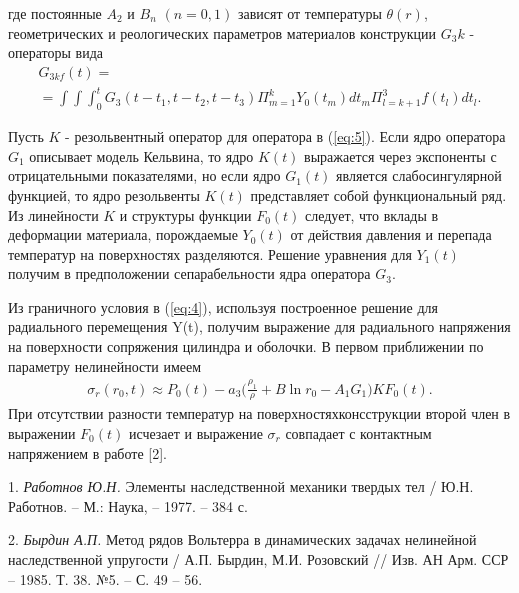 \noindent где постоянные $A_2$ и $B_n$ $(n=0,1)$ зависят от температуры $\theta(r)$,
геометрических и реологических параметров материалов конструкции $G_3k$ - операторы вида
\begin{equation*}
    \begin{gathered}
        G_{3kf}(t)= \\
        =\int\!\!\int\!\!\int^{t}_{0}G_3(t-t_1,t-t_2,t-t_3)\Pi^k_{m=1}Y_0(t_m)dt_m\Pi^3_{l=k+1}f(t_l)dt_l.
    \end{gathered}
\end{equation*}


Пусть $K$ - резольвентный оператор для оператора в (\ref{eq:5}). Если ядро оператора $G_1$ описывает модель Кельвина, то ядро $K(t)$ выражается через экспоненты с отрицательными показателями,
но если ядро $G_1(t)$ является слабосингулярной функцией, то ядро резольвенты $K(t)$ представляет собой функциональный ряд.
Из линейности $K$ и структуры функции $F_0(t)$ следует, что вклады в деформации материала, порождаемые $Y_0(t)$ от действия давления и перепада температур на поверхностях разделяются.
Решение уравнения для $Y_1(t)$ получим в предположении сепарабельности ядра оператора $G_3$.

Из граничного условия в (\ref{eq:4}), используя построенное решение для радиального перемещения Y(t), получим выражение для радиального напряжения на поверхности сопряжения цилиндра и оболочки. В первом приближении по параметру нелинейности имеем
\begin{equation}\label{eq:6}
    \begin{gathered}
        \sigma_r(r_0,t)\approx P_0(t)-a_3\bigg(\frac{\rho_1}{\rho}+B\ln r_0-A_1G_1\bigg)KF_0(t).
    \end{gathered}
\end{equation}
При отсутствии разности температур на поверхностях\linebreak консструкции второй член в выражении $F_0(t)$ исчезает и выражение $\sigma_r$ совпадает с контактным напряжением в работе [2].


\litlist

1. {\it Работнов Ю.Н.} Элементы наследственной механики твердых тел / Ю.Н. Работнов. – М.: Наука, – 1977. – 384 с.

2. {\it Бырдин А.П.} Метод рядов Вольтерра в динамических задачах  нелинейной наследственной упругости /  А.П. Бырдин, М.И. Розовский // Изв. АН Арм. ССР – 1985. Т. 38. №5. – С. 49 – 56.
